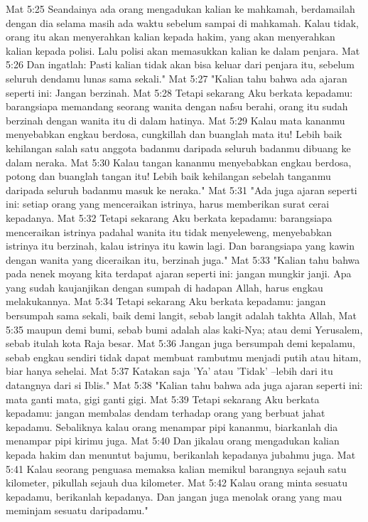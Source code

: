 Mat 5:25  Seandainya ada orang mengadukan kalian ke mahkamah, berdamailah dengan dia selama masih ada waktu sebelum sampai di mahkamah. Kalau tidak, orang itu akan menyerahkan kalian kepada hakim, yang akan menyerahkan kalian kepada polisi. Lalu polisi akan memasukkan kalian ke dalam penjara.
Mat 5:26  Dan ingatlah: Pasti kalian tidak akan bisa keluar dari penjara itu, sebelum seluruh dendamu lunas sama sekali."
Mat 5:27  "Kalian tahu bahwa ada ajaran seperti ini: Jangan berzinah.
Mat 5:28  Tetapi sekarang Aku berkata kepadamu: barangsiapa memandang seorang wanita dengan nafsu berahi, orang itu sudah berzinah dengan wanita itu di dalam hatinya.
Mat 5:29  Kalau mata kananmu menyebabkan engkau berdosa, cungkillah dan buanglah mata itu! Lebih baik kehilangan salah satu anggota badanmu daripada seluruh badanmu dibuang ke dalam neraka.
Mat 5:30  Kalau tangan kananmu menyebabkan engkau berdosa, potong dan buanglah tangan itu! Lebih baik kehilangan sebelah tanganmu daripada seluruh badanmu masuk ke neraka."
Mat 5:31  "Ada juga ajaran seperti ini: setiap orang yang menceraikan istrinya, harus memberikan surat cerai kepadanya.
Mat 5:32  Tetapi sekarang Aku berkata kepadamu: barangsiapa menceraikan istrinya padahal wanita itu tidak menyeleweng, menyebabkan istrinya itu berzinah, kalau istrinya itu kawin lagi. Dan barangsiapa yang kawin dengan wanita yang diceraikan itu, berzinah juga."
Mat 5:33  "Kalian tahu bahwa pada nenek moyang kita terdapat ajaran seperti ini: jangan mungkir janji. Apa yang sudah kaujanjikan dengan sumpah di hadapan Allah, harus engkau melakukannya.
Mat 5:34  Tetapi sekarang Aku berkata kepadamu: jangan bersumpah sama sekali, baik demi langit, sebab langit adalah takhta Allah,
Mat 5:35  maupun demi bumi, sebab bumi adalah alas kaki-Nya; atau demi Yerusalem, sebab itulah kota Raja besar.
Mat 5:36  Jangan juga bersumpah demi kepalamu, sebab engkau sendiri tidak dapat membuat rambutmu menjadi putih atau hitam, biar hanya sehelai.
Mat 5:37  Katakan saja 'Ya' atau 'Tidak' --lebih dari itu datangnya dari si Iblis."
Mat 5:38  "Kalian tahu bahwa ada juga ajaran seperti ini: mata ganti mata, gigi ganti gigi.
Mat 5:39  Tetapi sekarang Aku berkata kepadamu: jangan membalas dendam terhadap orang yang berbuat jahat kepadamu. Sebaliknya kalau orang menampar pipi kananmu, biarkanlah dia menampar pipi kirimu juga.
Mat 5:40  Dan jikalau orang mengadukan kalian kepada hakim dan menuntut bajumu, berikanlah kepadanya jubahmu juga.
Mat 5:41  Kalau seorang penguasa memaksa kalian memikul barangnya sejauh satu kilometer, pikullah sejauh dua kilometer.
Mat 5:42  Kalau orang minta sesuatu kepadamu, berikanlah kepadanya. Dan jangan juga menolak orang yang mau meminjam sesuatu daripadamu."
